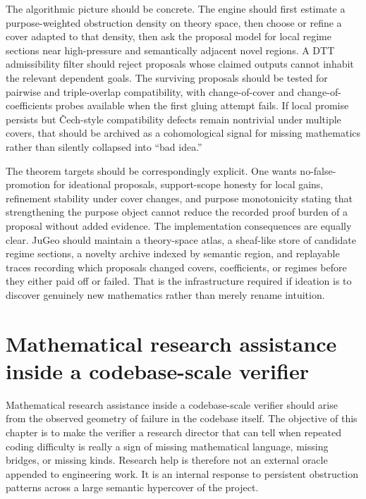 \documentclass[11pt]{report}
\begin{document}
The algorithmic picture should be concrete. The engine should first estimate a purpose-weighted obstruction density on theory space, then choose or refine a cover adapted to that density, then ask the proposal model for local regime sections near high-pressure and semantically adjacent novel regions. A DTT admissibility filter should reject proposals whose claimed outputs cannot inhabit the relevant dependent goals. The surviving proposals should be tested for pairwise and triple-overlap compatibility, with change-of-cover and change-of-coefficients probes available when the first gluing attempt fails. If local promise persists but \v{C}ech-style compatibility defects remain nontrivial under multiple covers, that should be archived as a cohomological signal for missing mathematics rather than silently collapsed into ``bad idea.''

The theorem targets should be correspondingly explicit. One wants no-false-promotion for ideational proposals, support-scope honesty for local gains, refinement stability under cover changes, and purpose monotonicity stating that strengthening the purpose object cannot reduce the recorded proof burden of a proposal without added evidence. The implementation consequences are equally clear. JuGeo should maintain a theory-space atlas, a sheaf-like store of candidate regime sections, a novelty archive indexed by semantic region, and replayable traces recording which proposals changed covers, coefficients, or regimes before they either paid off or failed. That is the infrastructure required if ideation is to discover genuinely new mathematics rather than merely rename intuition.

\chapter{Mathematical research assistance inside a codebase-scale verifier}
Mathematical research assistance inside a codebase-scale verifier should arise from the observed geometry of failure in the codebase itself. The objective of this chapter is to make the verifier a research director that can tell when repeated coding difficulty is really a sign of missing mathematical language, missing bridges, or missing kinds. Research help is therefore not an external oracle appended to engineering work. It is an internal response to persistent obstruction patterns across a large semantic hypercover of the project.
\end{document}
